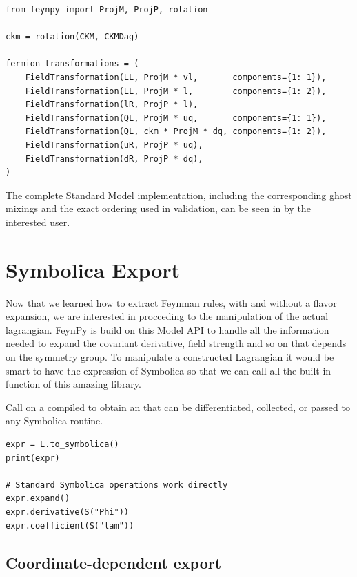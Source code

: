 \begin{verbatim}
from feynpy import ProjM, ProjP, rotation

ckm = rotation(CKM, CKMDag)

fermion_transformations = (
    FieldTransformation(LL, ProjM * vl,       components={1: 1}),
    FieldTransformation(LL, ProjM * l,        components={1: 2}),
    FieldTransformation(lR, ProjP * l),
    FieldTransformation(QL, ProjM * uq,       components={1: 1}),
    FieldTransformation(QL, ckm * ProjM * dq, components={1: 2}),
    FieldTransformation(uR, ProjP * uq),
    FieldTransformation(dR, ProjP * dq),
)
\end{verbatim}

\noindent The complete Standard Model implementation, including the corresponding ghost mixings and the exact
ordering used in validation, can be seen in 
 by the interested user. 

\section{Symbolica Export}
\label{sec:feynpy-symbolica-export}

Now that we learned how to extract Feynman rules, with and without a flavor expansion, we are interested in procceding to the manipulation of the actual lagrangian. FeynPy is build on this Model API to handle all the information needed to expand the covariant derivative, field strength and so on that depends on the symmetry group. To manipulate a constructed Lagrangian it would be smart to have the expression of Symbolica so that we can call all the built-in function of this amazing library.

Call  on a compiled  to obtain an  that can be differentiated, collected, or passed to any Symbolica routine.

\begin{verbatim}
expr = L.to_symbolica()
print(expr)

# Standard Symbolica operations work directly
expr.expand()
expr.derivative(S("Phi"))
expr.coefficient(S("lam"))
\end{verbatim}

\subsection*{Coordinate-dependent export}


